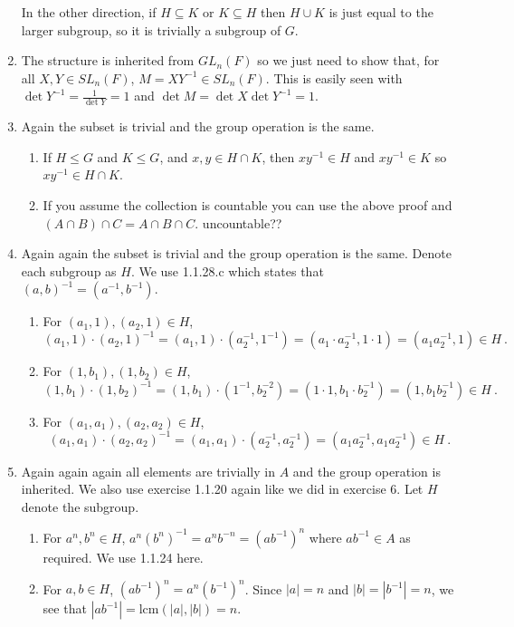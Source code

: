 \documentclass[]{article}
\newcommand{\abs}[1]{\left\vert #1 \right\vert}
\begin{document}
\begin{enumerate}
In the other direction, if $H\subseteq K$ or $K\subseteq H$ then $H\cup K$ is just equal to the larger subgroup, so it is trivially a subgroup of $G$.


\item The structure is inherited from $GL_n(F)$ so we just need to show that, for all $X,Y \in SL_n(F)$, $M = XY^{-1} \in SL_n(F)$. This is easily seen with $\det Y^{-1} = \frac{1}{\det Y} = 1$ and $\det M = \det X \det Y^{-1} = 1$.


\item Again the subset is trivial and the group operation is the same.
\begin{enumerate}
\item If $H\leq G$ and $K\leq G$, and $x,y \in H\cap K$, then $xy^{-1}\in H$ and $xy^{-1}\in K$ so $xy^{-1} \in H\cap K$.
\item If you assume the collection is countable you can use the above proof and $(A\cap B)\cap C = A\cap B\cap C$. {\color{red} uncountable??}
\end{enumerate}


\item Again again the subset is trivial and the group operation is the same. Denote each subgroup as $H$. We use 1.1.28.c which states that $(a,b)^{-1} = (a^{-1},b^{-1})$.
\begin{enumerate}
\item For $(a_1,1), (a_2,1) \in H$, 
\begin{equation}
(a_1,1)\cdot (a_2,1)^{-1} = (a_1,1)\cdot (a_2^{-1},1^{-1}) = (a_1\cdot a_2^{-1},1\cdot 1) = (a_1a_2^{-1},1) \in H\ .
\end{equation}
\item For $(1,b_1), (1,b_2) \in H$, 
\begin{equation}
(1,b_1)\cdot (1,b_2)^{-1} = (1,b_1)\cdot (1^{-1},b_2^{-2}) = (1\cdot 1,b_1\cdot b_2^{-1}) = (1,b_1b_2^{-1}) \in H\ .
\end{equation}
\item For $(a_1,a_1), (a_2,a_2) \in H$,
\begin{equation}
(a_1,a_1)\cdot (a_2,a_2)^{-1} = (a_1,a_1)\cdot (a_2^{-1},a_2^{-1}) = (a_1a_2^{-1},a_1a_2^{-1}) \in H\ .
\end{equation}
\end{enumerate}


\item Again again again all elements are trivially in $A$ and the group operation is inherited. We also use exercise 1.1.20 again like we did in exercise 6. Let $H$ denote the subgroup.
\begin{enumerate}
\item For $a^n,b^n \in H$, $a^n(b^n)^{-1} = a^nb^{-n} = (ab^{-1})^n$ where $ab^{-1}\in A$ as required. We use 1.1.24 here. 
\item For $a,b \in H$, $(ab^{-1})^n = a^n(b^{-1})^n$. Since $\abs{a} = n$ and $\abs{b} = \abs{b^{-1}} = n$, we see that $\abs{ab^{-1}} = \text{lcm}(\abs{a},\abs{b}) = n$.
\end{enumerate}



\end{enumerate}
\end{document}
